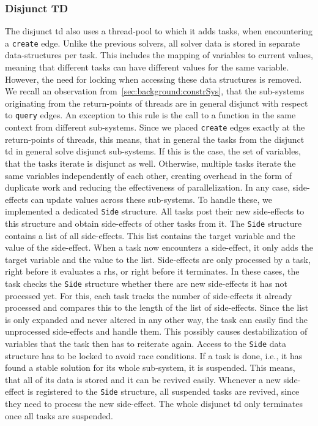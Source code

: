     \subsubsection{Disjunct TD}
    \label{sec:method:td_parallel:disjunct}
    The disjunct \ac{td} also uses a thread-pool to which it adds tasks, when encountering a \texttt{create} edge. Unlike the previous solvers, all solver data is stored in separate data-structures per task. This includes the mapping of variables to current values, meaning that different tasks can have different values for the same variable. However, the need for locking when accessing these data structures is removed. We recall an observation from~\autoref{sec:background:constrSys}, that the sub-systems originating from the return-points of threads are in general disjunct with respect to \texttt{query} edges. An exception to this rule is the call to a function in the same context from different sub-systems. Since we placed \texttt{create} edges exactly at the return-points of threads, this means, that in general the tasks from the disjunct \ac{td} in general solve disjunct sub-systems. If this is the case, the set of variables, that the tasks iterate is disjunct as well. Otherwise, multiple tasks iterate the same variables independently of each other, creating overhead in the form of duplicate work and reducing the effectiveness of parallelization.
    In any case, side-effects can update values across these sub-systems. To handle these, we implemented a dedicated \texttt{Side} structure. All tasks post their new side-effects to this structure and obtain side-effects of other tasks from it. The \texttt{Side} structure contains a list of all side-effects. This list contains the target variable and the value of the side-effect. When a task now encounters a side-effect, it only adds the target variable and the value to the list. Side-effects are only processed by a task, right before it evaluates a \ac{rhs}, or right before it terminates. In these cases, the task checks the \texttt{Side} structure whether there are new side-effects it has not processed yet. For this, each task tracks the number of side-effects it already processed and compares this to the length of the list of side-effects. Since the list is only expanded and never altered in any other way, the task can easily find the unprocessed side-effects and handle them. This possibly causes destabilization of variables that the task then has to reiterate again. Access to the \texttt{Side} data structure has to be locked to avoid race conditions.
    If a task is done, i.e., it has found a stable solution for its whole sub-system, it is suspended. This means, that all of its data is stored and it can be revived easily. Whenever a new side-effect is registered to the \texttt{Side} structure, all suspended tasks are revived, since they need to process the new side-effect. The whole disjunct \ac{td} only terminates once all tasks are suspended.
